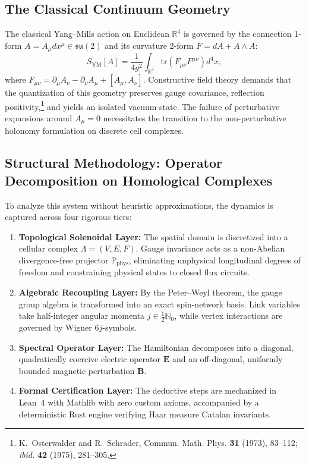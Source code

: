\documentclass[11pt,reqno]{article}
\begin{document}
\subsection{The Classical Continuum Geometry}
\label{subsec:classical_continuum_geom}
The classical Yang--Mills action on Euclidean $\mathbb{R}^4$ is governed by the connection 1-form $A = A_\mu dx^\mu \in \mathfrak{su}(2)$ and its curvature 2-form $F = d A + A \wedge A$:
\begin{equation}
    \label{eq:classical_ym_action}
    S_{\mathrm{YM}}[A] = \frac{1}{4g^2} \int_{\mathbb{R}^4} \mathrm{tr}\left( F_{\mu\nu} F^{\mu\nu} \right) d^4x,
\end{equation}
where $F_{\mu\nu} = \partial_\mu A_\nu - \partial_\nu A_\mu + [A_\mu, A_\nu]$. 
Constructive field theory demands that the quantization of this geometry preserves gauge covariance, reflection positivity,\footnote{K.~Osterwalder and R.~Schrader, Commun. Math. Phys. \textbf{31} (1973), 83--112; \emph{ibid.} \textbf{42} (1975), 281--305.} and yields an isolated vacuum state. The failure of perturbative expansions around $A_\mu = 0$ necessitates the transition to the non-perturbative holonomy formulation on discrete cell complexes.

\subsection{Structural Methodology: Operator Decomposition on Homological Complexes}
To analyze this system without heuristic approximations, the dynamics is captured across four rigorous tiers:
\begin{enumerate}
    \item \textbf{Topological Solenoidal Layer:} The spatial domain is discretized into a cellular complex $\Lambda = (V, E, F)$. Gauge invariance acts as a non-Abelian divergence-free projector $\mathbb{P}_{\mathrm{phys}}$, eliminating unphysical longitudinal degrees of freedom and constraining physical states to closed flux circuits.
    \item \textbf{Algebraic Recoupling Layer:} By the Peter--Weyl theorem, the gauge group algebra is transformed into an exact spin-network basis. Link variables take half-integer angular momenta $j \in \frac{1}{2}\mathbb{N}_0$, while vertex interactions are governed by Wigner $6j$-symbols.
    \item \textbf{Spectral Operator Layer:} The Hamiltonian decomposes into a diagonal, quadratically coercive electric operator $\mathbf{E}$ and an off-diagonal, uniformly bounded magnetic perturbation $\mathbf{B}$.
    \item \textbf{Formal Certification Layer:} The deductive steps are mechanized in Lean~4 with Mathlib with zero custom axioms, accompanied by a deterministic Rust engine verifying Haar measure Catalan invariants.
\end{enumerate}
\end{document}
